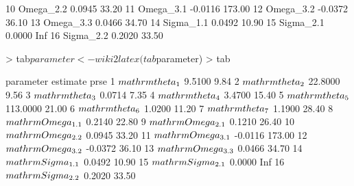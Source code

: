 \begin{Schunk}
\begin{Soutput}
10 Omega_2.2    0.0945  33.20
11 Omega_3.1   -0.0116 173.00
12 Omega_3.2   -0.0372  36.10
13 Omega_3.3    0.0466  34.70
14 Sigma_1.1    0.0492  10.90
15 Sigma_2.1    0.0000    Inf
16 Sigma_2.2    0.2020  33.50
\end{Soutput}
\begin{Sinput}
> tab$parameter <- wiki2latex(tab$parameter)
> tab
\end{Sinput}
\begin{Soutput}
                   parameter estimate   prse
1    $\\mathrm{\\theta_{1}}$   9.5100   9.84
2    $\\mathrm{\\theta_{2}}$  22.8000   9.56
3    $\\mathrm{\\theta_{3}}$   0.0714   7.35
4    $\\mathrm{\\theta_{4}}$   3.4700  15.40
5    $\\mathrm{\\theta_{5}}$ 113.0000  21.00
6    $\\mathrm{\\theta_{6}}$   1.0200  11.20
7    $\\mathrm{\\theta_{7}}$   1.1900  28.40
8  $\\mathrm{\\Omega_{1.1}}$   0.2140  22.80
9  $\\mathrm{\\Omega_{2.1}}$   0.1210  26.40
10 $\\mathrm{\\Omega_{2.2}}$   0.0945  33.20
11 $\\mathrm{\\Omega_{3.1}}$  -0.0116 173.00
12 $\\mathrm{\\Omega_{3.2}}$  -0.0372  36.10
13 $\\mathrm{\\Omega_{3.3}}$   0.0466  34.70
14 $\\mathrm{\\Sigma_{1.1}}$   0.0492  10.90
15 $\\mathrm{\\Sigma_{2.1}}$   0.0000    Inf
16 $\\mathrm{\\Sigma_{2.2}}$   0.2020  33.50
\end{Soutput}
\end{Schunk}
